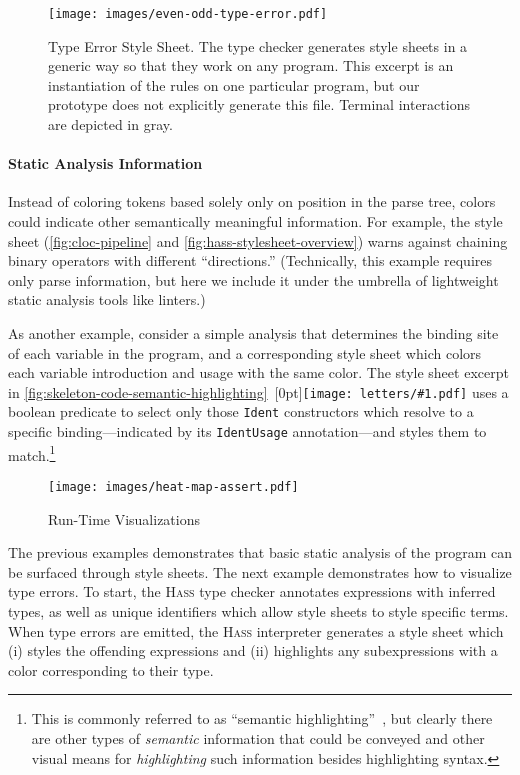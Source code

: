 \documentclass[acmsmall, screen]{acmart}
\newcommand{\parahead}[1]
  {\paragraph{\textbf{#1}}}
\newcommand{\hass}
{\textsc{Hass}}
\newcommand{\figBubble}[1]{\raisebox{-0.03in}[0pt]{\texttt{[image: letters/\#1.pdf]}}}
\newcommand{\refBubble}[1]
  {~\figBubble{#1}}
\begin{document}
\begin{figure}[b]
  \texttt{[image: images/even-odd-type-error.pdf]}
\caption{Type Error Style Sheet.
The type checker generates style sheets in a generic way so that they work on any program.
This excerpt is an {instantiation} of the rules on one particular program,
but our prototype does not explicitly generate this file. Terminal interactions are depicted in gray.
}
\label{fig:even-odd-type-error}
\end{figure}
 
\parahead{Static Analysis Information}



Instead of coloring tokens based solely only on position in the parse tree, colors could indicate other semantically meaningful information.
For example, the  style sheet (\autoref{fig:cloc-pipeline} and \autoref{fig:hass-stylesheet-overview}) warns against chaining binary operators with different ``directions.''
(Technically, this example requires only parse information, but here we include it under the umbrella of lightweight static analysis tools like linters.)

As another example, consider a simple analysis that determines the binding site of each variable in the program, and a corresponding  style sheet which colors each variable introduction and usage with the same color.
The style sheet excerpt in \autoref{fig:skeleton-code-semantic-highlighting}\refBubble{b} uses a boolean predicate to select only those \texttt{Ident} constructors which resolve to a specific binding---indicated by its \texttt{IdentUsage} annotation---and styles them to match.\footnote{This is commonly referred to as ``semantic highlighting''~\cite{vscode_semantic_highlighting}, but clearly there are other types of \emph{semantic} information that could be conveyed and other visual means for \emph{highlighting} such information besides highlighting syntax.}







\begin{wrapfigure}[37]{r}{2.7in}
  \vspace{-0.09in}
  \texttt{[image: images/heat-map-assert.pdf]}
\caption{Run-Time Visualizations}
  \label{fig:heat-map-assert}
\end{wrapfigure}
 The previous examples demonstrates that basic static analysis of the program can be surfaced through style sheets.
The next example demonstrates how to visualize type errors.
To start, the \hass{} type checker annotates expressions with inferred types, as well as unique identifiers which allow style sheets to style specific terms.
When type errors are emitted, the \hass{} interpreter generates a style sheet which (i) styles the offending expressions and (ii) highlights any subexpressions with a color corresponding to their type.
\end{document}
